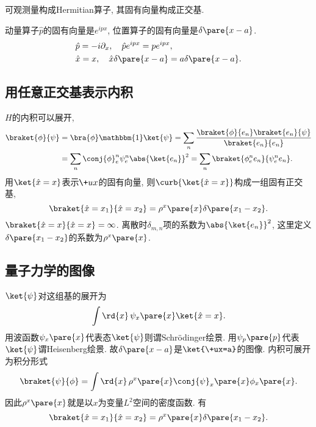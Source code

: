 \documentclass[hidelinks]{ctexart}
\begin{document}
\newpoint{}可观测量构成Hermitian算子, 其固有向量构成正交基.
\begin{ex}
    动量算子$\hat p$的固有向量是$e^{ipx}$, 位置算子的固有向量是$\delta\pare{x-a}$.
    \begin{align*}
        & \hat p = -i\partial_x,\quad \hat p e^{ipx} = pe^{ipx}, \\
        & \hat x = x,\quad \hat x\delta\pare{x-a} = a\delta\pare{x-a}.
    \end{align*}
\end{ex}


\subsection{用任意正交基表示内积} %
\label{sub:用任意正交基表示内积}

\newpoint{}$H$的内积可以展开,
\begin{align*}
    \braket{\phi}{\psi} &= \bra{\phi}\mathbbm{1}\ket{\psi} = \sum_n \frac{\braket{\phi}{e_n}\braket{e_n}{\psi}}{\braket{e_n}{e_n}} \\
    &= \sum_n \conj{\phi}_e^n \psi_e^n \abs{\ket{e_n}}^2 = \sum_n \braket{\phi_e^n e_n}{\psi_e^n e_n}.
\end{align*}
\newpoint{}用$\ket{\hat x=x}$表示$\+ux$的固有向量, 则$\curb{\ket{\hat x=x}}$构成一组固有正交基,
\[ \braket{\hat x=x_1}{\hat x=x_2} = \rho^x\pare{x}\delta\pare{x_1-x_2}. \]
\newpoint{}$\braket{\hat x = x}{\hat x = x} = \infty$. 离散时$\delta_{m,n}$项的系数为$\abs{\ket{e_n}}^2$, 这里定义$\delta\pare{x_1-x_2}$的系数为$\rho^x\pare{x}$.


\subsection{量子力学的图像} %
\label{sub:量子力学的图像}

\newpoint{}$\ket{\psi}$对这组基的展开为
\[ \int \rd{x}\,\psi_x\pare{x}\ket{\hat x=x}. \]
\newpoint{}用波函数$\psi_x\pare{x}$代表态$\ket{\psi}$则谓Schr\"odinger绘景.
\newpoint{}用$\psi_p\pare{p}$代表$\ket{\psi}$谓Heisenberg绘景.
\newpoint{}故$\delta\pare{x-a}$是$\ket{\+ux=a}$的图像.
\newpoint{}内积可展开为积分形式
\[ \braket{\psi}{\phi} = \int \rd{x}\, \rho^x\pare{x}\conj{\psi}_x\pare{x}\phi_x\pare{x}. \]
\newpoint{}因此$\rho^x\pare{x}$就是以$x$为变量$L^2$空间的密度函数.
\newpoint{}有
\[ \braket{\hat x = x_1}{\hat x = x_2} = \rho^x\pare{x}\delta\pare{x_1-x_2}. \]
\end{document}

